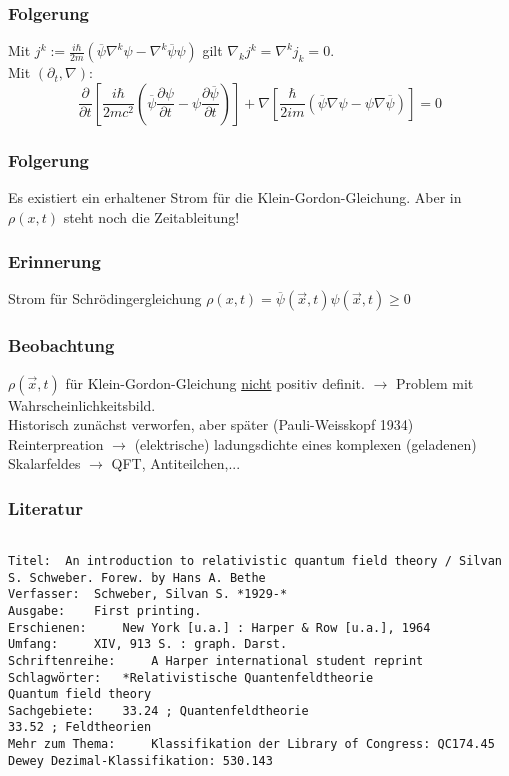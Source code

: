 \documentclass[twoside,a4paper]{scrartcl}
\renewcommand{\1}{\mathds{1}}
\newcommand{\ra}{\rightarrow}
\begin{document}
\subsubsection*{Folgerung}
Mit $j^k:=\frac{i\hbar}{2m}(\overline{\psi}\nabla^k\psi-\nabla^k \overline{\psi} \psi)$ gilt $\nabla_k j^k=\nabla^kj_k=0$.\\
Mit $(\partial_t,\nabla)$:
$$\frac{\partial}{\partial t}[\frac{i\hbar}{2mc^2}(\overline{\psi}\frac{\partial \psi}{\partial t}-\psi \frac{\partial \overline{\psi}}{\partial t})]+\nabla[\frac{\hbar}{2im}(\overline{\psi}\nabla \psi-\psi\nabla \overline{\psi})]=0$$
\subsubsection*{Folgerung}
Es existiert ein erhaltener Strom für die Klein-Gordon-Gleichung. Aber in $\rho(x,t)$ steht noch die Zeitableitung!
\subsubsection*{Erinnerung}
Strom für Schrödingergleichung $\rho(x,t)=\overline{\psi}(\vec x,t) \psi(\vec x,t)\geq 0$
\subsubsection*{Beobachtung}
$\rho(\vec x,t)$ für Klein-Gordon-Gleichung \underline{nicht} positiv definit. $\ra$ Problem mit Wahrscheinlichkeitsbild.\\
Historisch zunächst verworfen, aber später (Pauli-Weisskopf 1934) Reinterpreation $\ra$ (elektrische) ladungsdichte eines komplexen (geladenen) Skalarfeldes $\ra$ QFT, Antiteilchen,...
\subsubsection*{Literatur}
\begin{tiny}
\begin{verbatim}

Titel: 	An introduction to relativistic quantum field theory / Silvan S. Schweber. Forew. by Hans A. Bethe
Verfasser: 	Schweber, Silvan S. *1929-*
Ausgabe: 	First printing.
Erschienen: 	New York [u.a.] : Harper & Row [u.a.], 1964
Umfang: 	XIV, 913 S. : graph. Darst.
Schriftenreihe: 	A Harper international student reprint
Schlagwörter: 	*Relativistische Quantenfeldtheorie
Quantum field theory
Sachgebiete: 	33.24 ; Quantenfeldtheorie
33.52 ; Feldtheorien
Mehr zum Thema: 	Klassifikation der Library of Congress: QC174.45
Dewey Dezimal-Klassifikation: 530.143
\end{verbatim}
\end{tiny}
\end{document}
